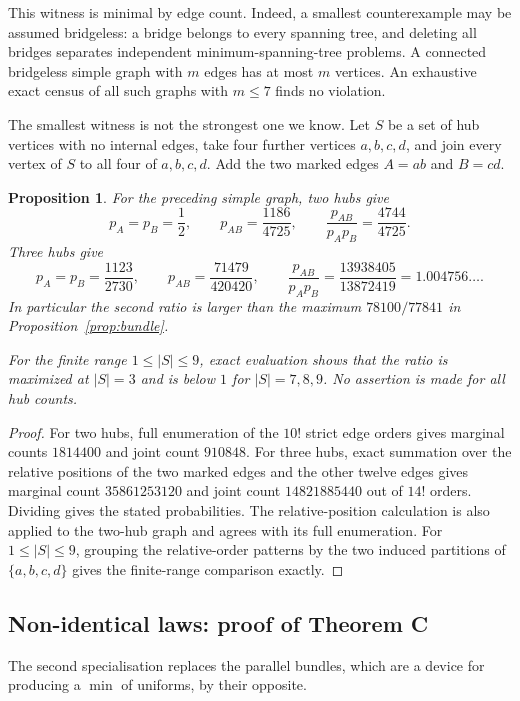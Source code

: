\documentclass[11pt,a4paper]{amsart}
\theoremstyle{plain}
\newtheorem{proposition}[theorem]{Proposition}
\theoremstyle{definition}
\theoremstyle{remark}
\begin{document}
This witness is minimal by edge count. Indeed, a smallest counterexample may be
assumed bridgeless: a bridge belongs to every spanning tree, and deleting all
bridges separates independent minimum-spanning-tree problems. A connected
bridgeless simple graph with $m$ edges has at most $m$ vertices. An exhaustive
exact census of all such graphs with $m\le7$ finds no violation.

The smallest witness is not the strongest one we know. Let $S$ be a set of hub
vertices with no internal edges, take four further vertices $a,b,c,d$, and join
every vertex of $S$ to all four of $a,b,c,d$. Add the two marked edges $A=ab$
and $B=cd$.

\begin{proposition}
\label{prop:hub-witnesses}
For the preceding simple graph, two hubs give
\[
p_A=p_B=\frac12,\qquad p_{AB}=\frac{1186}{4725},\qquad
\frac{p_{AB}}{p_Ap_B}=\frac{4744}{4725}.
\]
Three hubs give
\[
p_A=p_B=\frac{1123}{2730},\qquad p_{AB}=\frac{71479}{420420},\qquad
\frac{p_{AB}}{p_Ap_B}=\frac{13938405}{13872419}
   =1.004756\ldots .
\]
In particular the second ratio is larger than the maximum
$78100/77841$ in Proposition~\ref{prop:bundle}.

For the finite range $1\le |S|\le9$, exact evaluation shows that the ratio is
maximized at $|S|=3$ and is below $1$ for $|S|=7,8,9$. No assertion is made
for all hub counts.
\end{proposition}

\begin{proof}
For two hubs, full enumeration of the $10!$ strict edge orders gives marginal
counts $1814400$ and joint count $910848$. For three hubs, exact summation over
the relative positions of the two marked edges and the other twelve edges gives
marginal count $35861253120$ and joint count $14821885440$ out of $14!$ orders.
Dividing gives the stated probabilities. The relative-position calculation is
also applied to the two-hub graph and agrees with its full enumeration.
For $1\le |S|\le9$, grouping the relative-order patterns by the two induced
partitions of $\{a,b,c,d\}$ gives the finite-range comparison exactly.
\end{proof}

\subsection{Non-identical laws: proof of Theorem C}
\label{sec:nonidentical}

The second specialisation replaces the parallel bundles, which are a device for
producing a $\min$ of uniforms, by their opposite.
\end{document}

